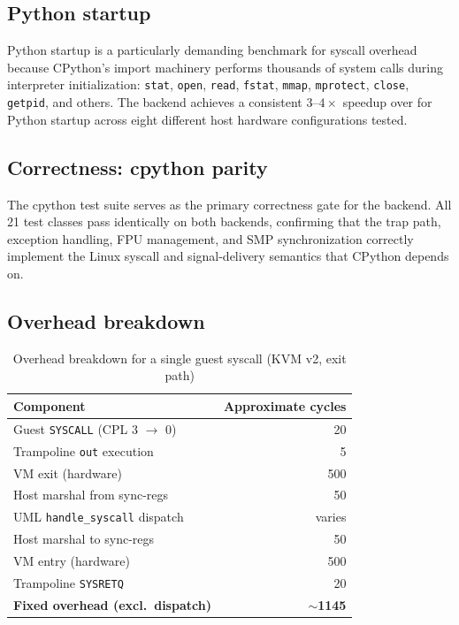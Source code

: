\subsection{Python startup}

Python startup is a particularly demanding benchmark for syscall overhead
because CPython's import machinery performs thousands of system calls
during interpreter initialization: \texttt{stat}, \texttt{open},
\texttt{read}, \texttt{fstat}, \texttt{mmap}, \texttt{mprotect},
\texttt{close}, \texttt{getpid}, and others.  The \KVMvTwo{} backend
achieves a consistent $3$--$4\times$ speedup over \Seccomp{} for Python
startup across eight different host hardware configurations tested.

\subsection{Correctness: cpython parity}

The cpython test suite serves as the primary correctness gate for the
\KVMvTwo{} backend.  All 21 test classes pass identically on both backends,
confirming that the \KVMvTwo{} trap path, exception handling, FPU
management, and SMP synchronization correctly implement the Linux syscall
and signal-delivery semantics that CPython depends on.

\subsection{Overhead breakdown}

\begin{table}[ht]
\centering
\caption{Overhead breakdown for a single guest syscall (KVM v2, exit path)}
\label{tab:kvm-overhead-breakdown}
\begin{tabular}{lr}
\toprule
\textbf{Component} & \textbf{Approximate cycles} \\
\midrule
Guest \texttt{SYSCALL} (CPL 3 $\to$ 0) & 20 \\
Trampoline \texttt{out} execution       & 5 \\
VM exit (hardware)                      & 500 \\
Host marshal from sync-regs             & 50 \\
UML \texttt{handle\_syscall} dispatch   & varies \\
Host marshal to sync-regs               & 50 \\
VM entry (hardware)                     & 500 \\
Trampoline \texttt{SYSRETQ}            & 20 \\
\midrule
\textbf{Fixed overhead (excl.\ dispatch)} & $\sim$\textbf{\num{1145}} \\
\bottomrule
\end{tabular}
\end{table}

